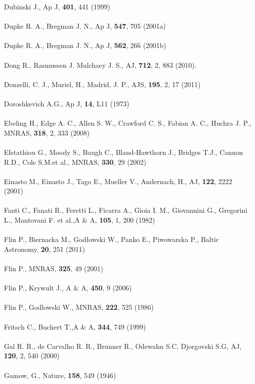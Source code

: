 Dubinski J., Ap J, \textbf{401}, 441 (1999)\\\\
Dupke R. A., Bregman J. N., Ap J, \textbf{547}, 705 (2001a)\\\\
Dupke R. A., Bregman J. N., Ap J, \textbf{562}, 266 (2001b)\\\\
Dong R., Rasmussen J. Mulchaey J. S., AJ, \textbf{712},  2, 883 (2010).\\\\
Donzelli, C. J., Muriel, H., Madrid, J. P., AJS, \textbf{195},  2, 17 (2011)\\\\
Doroshkevich A.G., Ap J, \textbf{14}, L11 (1973)\\\\
Ebeling H., Edge A. C., Allen S. W., Crawford C. S., Fabian A. C., Huchra J. P., MNRAS, \textbf{318},  2, 333 (2008)\\\\
Efstathiou G., Moody S., Baugh C., Bland-Hawthorn J., Bridges T.J., Cannon R.D., Cole S.M.et al., MNRAS, \textbf{330}, 29 (2002)\\\\
Einasto M., Einasto J., Tago E., Mueller V., Andernach, H., AJ, \textbf{122}, 2222 (2001)\\\\
Fanti C., Fanati R., Feretti L., Ficarra A., Gioia I. M., Giovannini G., Gregorini L., Mantovani F. et al.,A \& A, \textbf{105},  1, 200 (1982)\\\\
Flin P., Biernacka M., Godłowski W., Panko E., Piwowarska P., Baltic Astronomy, \textbf{20}, 251 (2011)\\\\
Flin P., MNRAS, \textbf{325}, 49 (2001)\\\\
Flin P., Krywult J., A \& A, \textbf{450}, 9 (2006)\\\\
Flin P., Godlowski W., MNRAS, \textbf{222}, 525 (1986)\\\\
Fritsch C., Buchert T.,A \& A, \textbf{344}, 749 (1999)\\\\
Gal R. R., de Carvalho R. R., Brunner R., Odewahn S.C, Djorgovski S.G, AJ, \textbf{120},  2, 540 (2000)\\\\
Gamow, G., Nature, \textbf{158}, 549 (1946)\\\\
